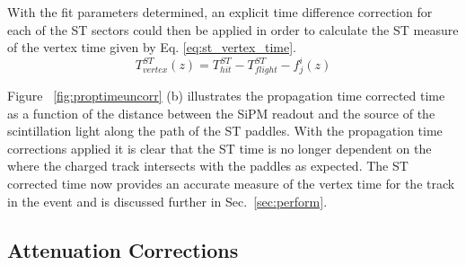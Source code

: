 	
With the fit parameters determined, an explicit time difference correction for each of the ST sectors could then be applied in order to calculate the ST measure of the vertex time given by Eq. \ref{eq:st_vertex_time}.
	\begin{equation}\label{eq:st_vertex_time}
	 	T^{ST}_{vertex}(z) = T^{ST}_{hit} - T^{ST}_{flight} - f^{i}_{j}(z)
	\end{equation} 
	
Figure ~\ref{fig:proptimeuncorr} (b) illustrates the propagation time corrected time as a function of the distance between the SiPM readout and the source of the scintillation light along the path of the ST paddles.
With the propagation time corrections applied it is clear that the ST time is no longer dependent on the where the charged track intersects with the paddles as expected.  The ST corrected time now provides an accurate measure of the vertex time for the track in the event and is discussed further in Sec.~\ref{sec:perform}.

\subsection{Attenuation Corrections} \label{sec:calib_ac}



